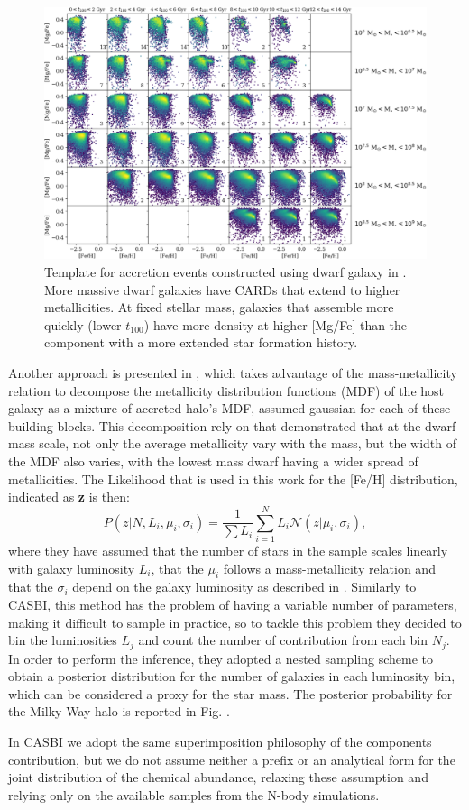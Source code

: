 \begin{figure}[h]
    \centering
    \includegraphics[width=1\textwidth]{./figure/CARDS.jpg}
    \caption{Template for accretion events constructed using dwarf galaxy in \cite{cunninghamReadingCARDsImprint2022}. More massive dwarf galaxies have CARDs that extend to higher metallicities. At fixed stellar mass, galaxies that assemble more quickly (lower $t_{100}$) have more density at higher [Mg/Fe] than the component with a more extended star formation history.}
    \label{fig:CARDS}
\end{figure}

Another approach is presented in \cite{deasonUnravellingMassSpectrum2023}, which takes advantage of the mass-metallicity relation to decompose the metallicity distribution functions (MDF) of the host galaxy as a mixture of accreted halo's MDF, assumed gaussian for each of these building blocks. This decomposition rely on \cite{kirbyMULTIELEMENTABUNDANCEMEASUREMENTS2011} that demonstrated that at the dwarf mass scale, not only the average metallicity vary with the mass, but the width of the MDF also varies, with the lowest mass dwarf having a wider spread of metallicities. The Likelihood that is used in this work for the [Fe/H] distribution, indicated as \textbf{z} is then:
\begin{equation}
    P(z|N, {L_i}, {\mu_i}, {\sigma_i}) = \frac{1}{\sum{L_i}} \sum_{i=1}^N L_i \mathcal{N}(z|\mu_i, \sigma_i),
\end{equation}
where they have assumed that the number of stars in the sample scales linearly with galaxy luminosity $L_i$, that the $\mu_i$ follows a mass-metallicity relation and that the $\sigma_i$ depend on the galaxy luminosity as described in \cite{kirbyMULTIELEMENTABUNDANCEMEASUREMENTS2011}. 
Similarly to CASBI, this method has the problem of having a variable number of parameters, making it difficult to sample in practice, so to tackle this problem they decided to bin the luminosities $L_j$ and count the number of contribution from each bin $N_j$. In order to perform the inference, they adopted a nested sampling scheme to obtain a posterior distribution for the number of galaxies in each luminosity bin, which can be considered a proxy for the star mass. The posterior probability for the Milky Way halo is reported in Fig. .

In CASBI we adopt the same superimposition philosophy of the components contribution, but we do not assume neither a prefix or an analytical form for the joint distribution of the chemical abundance, relaxing these assumption and relying only on the available samples from the N-body simulations.  